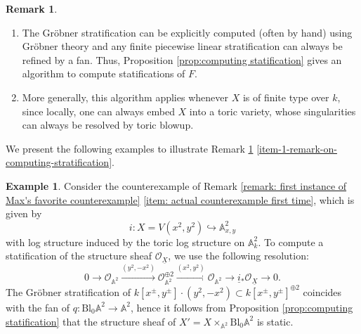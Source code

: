 \documentclass[11pt]{amsart}
\theoremstyle{definition}
\theoremstyle{definition}
\newtheorem{remark}[theorem]{Remark}
\newtheorem{example}[theorem]{Example}
\newcommand{\cO}{\mathcal{O}}
\newcommand{\ul}[1]{\underline{#1}}
\newcommand{\cal}{\mathcal}
\def\cO{{\cal O}}
\begin{document}
\begin{remark}\label{remark on computing statification}
\begin{enumerate}
    \item\label{item-1-remark-on-computing-stratification} The Gröbner stratification can be explicitly computed (often by hand) using Gröbner theory and any finite piecewise linear stratification can always be refined by a fan. Thus, Proposition \ref{prop:computing statification} gives an algorithm to compute statifications of $F$.
    \item More generally, this algorithm applies whenever $X$ is of finite type over $k$, since locally, one can always embed $X$ into a toric variety, whose singularities can always be resolved by toric blowup.
\end{enumerate}
\end{remark}
We present the following examples to illustrate Remark \ref{remark on computing statification} \eqref{item-1-remark-on-computing-stratification}.
\begin{example}\label{example: statification of structure sheaf 1}
Consider the counterexample of Remark \ref{remark: first instance of Max's favorite counterexample} \eqref{item: actual counterexample first time}, which is given by $$
    i\colon X= V(x^{2},y^{2})\hookrightarrow  \mathbb{A}^2_{x,y}
$$ 
with log structure induced by the toric log structure on $\mathbb{A}^2_k$.
To compute a statification of the structure sheaf $\cO_{\ul{X}}$, we use the following resolution:
$$ 0 \longrightarrow 
\mathcal {O}_{\mathbb{A}^2}
\xrightarrow{(y^{2}, -x^{2})}
\mathcal{O}_{\mathbb{A}^2}^{\oplus 2}
\xrightarrow{(x^2,y^2)}
   \mathcal{O}_{\mathbb{A}^2}
   \longrightarrow
   \underline{i}{}_*\cO_{\ul{X}}
   \longrightarrow 0.
$$
The Gröbner stratification of $k[x^{\pm},y^{\pm}]\cdot (y^2,-x^2)\subset k[x^{\pm},y^{\pm}]^{\oplus 2}$ coincides with the fan of $q\colon\text{Bl}_0\mathbb{A}^2\rightarrow \mathbb{A}^2$, hence it follows from Proposition \ref{prop:computing statification} that the structure sheaf of $X' = X\times_{\mathbb{A}^2}\text{Bl}_0\mathbb{A}^2$ is static.
\end{example}
\end{document}
